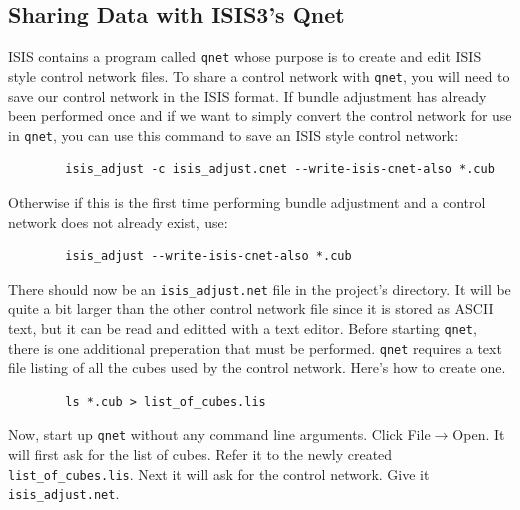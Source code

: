 \subsection{Sharing Data with ISIS3's Qnet}

ISIS contains a program called \texttt{qnet} whose purpose is to
create and edit ISIS style control network files. To share a control
network with \texttt{qnet}, you will need to save our control network
in the ISIS format. If bundle adjustment has already been performed
once and if we want to simply convert the control network for use in
{\tt qnet}, you can use this command to save an ISIS style control
network:

\begin{verbatim}
        isis_adjust -c isis_adjust.cnet --write-isis-cnet-also *.cub
\end{verbatim}

Otherwise if this is the first time performing bundle adjustment and a
control network does not already exist, use:

\begin{verbatim}
        isis_adjust --write-isis-cnet-also *.cub
\end{verbatim}

There should now be an \verb=isis_adjust.net= file in the project's
directory. It will be quite a bit larger than the other control
network file since it is stored as ASCII text, but it can be read and
editted with a text editor. Before starting \texttt{qnet}, there is one
additional preperation that must be performed. \texttt{qnet} requires
a text file listing of all the cubes used by the control
network. Here's how to create one.

\begin{verbatim}
        ls *.cub > list_of_cubes.lis
\end{verbatim}

Now, start up \texttt{qnet} without any command line arguments. Click
File$\rightarrow$Open. It will first ask for the list of cubes. Refer
it to the newly created \verb=list_of_cubes.lis=. Next it will ask for
the control network. Give it \verb=isis_adjust.net=.

\begin{center}
\end{center}

